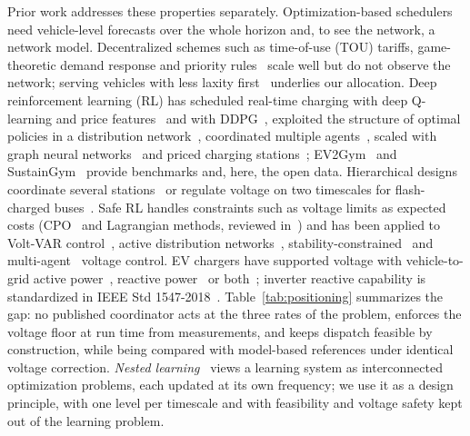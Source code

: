 \documentclass[journal]{IEEEtran}
\begin{document}
Prior work addresses these properties separately. Optimization-based
schedulers~\cite{clement2010,ortegavazquez2014} need vehicle-level forecasts
over the whole horizon and, to see the network, a network model.
Decentralized schemes such as time-of-use (TOU) tariffs, game-theoretic demand
response and priority rules~\cite{mohsenian2010,ma2013,xu2016priority} scale
well but do not observe the network; serving vehicles with less laxity
first~\cite{xu2016priority} underlies our allocation. Deep reinforcement
learning (RL) has scheduled real-time charging with deep Q-learning and price
features~\cite{wan2019} and with DDPG~\cite{zhang2020cddpg}, exploited the
structure of optimal policies in a distribution network~\cite{jin2020},
coordinated multiple agents~\cite{dasilva2020}, scaled with graph neural
networks~\cite{orfanoudakis2025} and priced charging
stations~\cite{zhao2022pricing}; EV2Gym~\cite{orfanoudakis2025ev2gym} and
SustainGym~\cite{yeh2023sustaingym} provide benchmarks and, here, the open
data. Hierarchical designs coordinate several stations~\cite{saner2022} or
regulate voltage on two timescales for flash-charged
buses~\cite{wang2025flash}. Safe RL handles constraints such as voltage
limits as expected costs (CPO~\cite{achiam2017} and Lagrangian methods,
reviewed in~\cite{su2025review}) and has been applied to Volt-VAR
control~\cite{wang2020voltvar}, active distribution networks~\cite{kou2020},
stability-constrained~\cite{shi2022stability} and
multi-agent~\cite{wang2024safemarl} voltage control. EV chargers have
supported voltage with vehicle-to-grid active power~\cite{singh2013}, reactive
power~\cite{leemput2015} or both~\cite{wang2023coord}; inverter reactive
capability is standardized in IEEE Std 1547-2018~\cite{ieee1547}.
Table~\ref{tab:positioning} summarizes the gap: no published coordinator acts
at the three rates of the problem, enforces the voltage floor at run time from
measurements, and keeps dispatch feasible by construction, while being
compared with model-based references under identical voltage correction.
\emph{Nested learning}~\cite{behrouz2025} views a learning system as
interconnected optimization problems, each updated at its own frequency; we
use it as a design principle, with one level per timescale and with
feasibility and voltage safety kept out of the learning problem.
\end{document}
